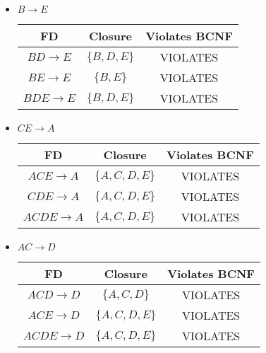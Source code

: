 \documentclass[12pt,letterpaper]{article}
\begin{document}
\begin{enumerate}
\begin{enumerate}
          \begin{itemize}
            \item $B \rightarrow E$

              \begin{tabular}{c | c | c |}
                FD                    & Closure             & Violates BCNF \\
                \hline
                $BD \rightarrow E$    & $\{B, D, E\}$       & VIOLATES \\
                \hline
                $BE \rightarrow E$    & $\{B, E\}$          & VIOLATES \\
                \hline
                $BDE \rightarrow E$   & $\{B, D, E\}$       & VIOLATES \\
                \hline
              \end{tabular}

            \item $CE \rightarrow A$

              \begin{tabular}{c | c | c |}
                FD                    & Closure             & Violates BCNF \\
                \hline
                $ACE \rightarrow A$   & $\{A, C, D, E\}$    & VIOLATES \\
                \hline
                $CDE \rightarrow A$   & $\{A, C, D, E\}$    & VIOLATES \\
                \hline
                $ACDE \rightarrow A$  & $\{A, C, D, E\}$    & VIOLATES \\
                \hline
              \end{tabular}

            \item $AC \rightarrow D$

              \begin{tabular}{c | c | c |}
                FD                    & Closure             & Violates BCNF \\
                \hline
                $ACD \rightarrow D$   & $\{A, C, D\}$       & VIOLATES \\
                \hline
                $ACE \rightarrow D$   & $\{A, C, D, E\}$    & VIOLATES \\
                \hline
                $ACDE \rightarrow D$  & $\{A, C, D, E\}$    & VIOLATES \\
                \hline
              \end{tabular}
          \end{itemize}


\end{enumerate}
\end{enumerate}
\end{document}
